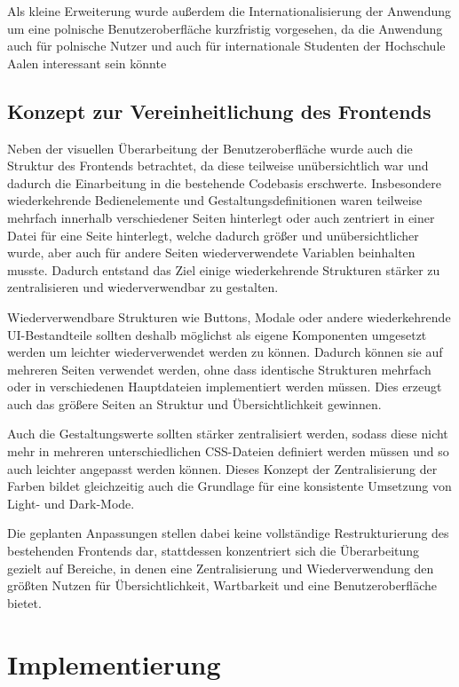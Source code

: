﻿\documentclass[oneside]{ausarbeitung}
\begin{document}
Als kleine Erweiterung wurde außerdem die Internationalisierung der Anwendung um eine polnische Benutzeroberfläche kurzfristig vorgesehen,
da die Anwendung auch für polnische Nutzer und auch für internationale Studenten der Hochschule Aalen interessant sein könnte


\section{Konzept zur Vereinheitlichung des Frontends}
\label{sec:frontend-vereinheitlichung}

Neben der visuellen Überarbeitung der Benutzeroberfläche wurde auch die Struktur des Frontends betrachtet, da diese teilweise unübersichtlich war 
und dadurch die Einarbeitung in die bestehende Codebasis erschwerte. Insbesondere wiederkehrende Bedienelemente und Gestaltungsdefinitionen 
waren teilweise mehrfach innerhalb verschiedener Seiten hinterlegt oder auch zentriert in einer Datei für eine Seite hinterlegt, welche dadurch größer 
und unübersichtlicher wurde, aber auch für andere Seiten wiederverwendete Variablen beinhalten musste. Dadurch entstand das Ziel einige wiederkehrende
Strukturen stärker zu zentralisieren und wiederverwendbar zu gestalten.

Wiederverwendbare Strukturen wie Buttons, Modale oder andere wiederkehrende UI-Bestandteile sollten deshalb möglichst als eigene Komponenten umgesetzt
werden um leichter wiederverwendet werden zu können. Dadurch können sie auf mehreren Seiten verwendet werden, ohne dass identische Strukturen mehrfach
oder in verschiedenen Hauptdateien implementiert werden müssen. Dies erzeugt auch das größere Seiten an Struktur und Übersichtlichkeit gewinnen.

Auch die Gestaltungswerte sollten stärker zentralisiert werden, sodass diese nicht mehr in mehreren unterschiedlichen CSS-Dateien definiert werden
müssen und so auch leichter angepasst werden können. Dieses Konzept der Zentralisierung der Farben bildet gleichzeitig auch die Grundlage für eine
konsistente Umsetzung von Light- und Dark-Mode.

Die geplanten Anpassungen stellen dabei keine vollständige Restrukturierung des bestehenden Frontends dar, stattdessen konzentriert sich die
Überarbeitung gezielt auf Bereiche, in denen eine Zentralisierung und Wiederverwendung den größten Nutzen für Übersichtlichkeit, Wartbarkeit und
eine Benutzeroberfläche bietet.



\chapter{Implementierung}
\label{cha:implementierung}
\end{document}
